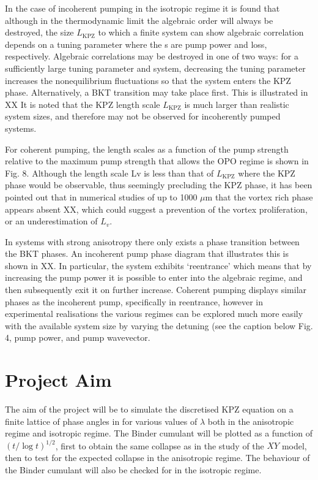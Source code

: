 In the case of incoherent pumping in the isotropic regime
it is found that although in the thermodynamic limit the
algebraic order will always be destroyed, the size $L_{\text{KPZ}}$ to which
a finite system can show algebraic correlation depends on a tuning parameter where the s are pump power and loss, respectively. Algebraic correlations may be destroyed in one of two ways: for a sufficiently large tuning parameter and system, decreasing the tuning parameter increases the nonequilibrium fluctuations so that the system enters the KPZ phase. Alternatively, a BKT transition may take place first. This is illustrated in XX It is noted that the KPZ length scale $L_{\text{KPZ}}$ is much larger than realistic system sizes, and therefore may not be observed for incoherently pumped systems.

For coherent pumping, the length scales as a function of the pump strength relative to the maximum pump strength that allows the OPO regime is shown in Fig. 8. Although the length scale Lv is less than that of $L_{\text{KPZ}}$ where the KPZ phase would be observable, thus seemingly precluding the KPZ phase, it has been pointed out that in numerical studies of up to 1000 $\mu$m that the vortex rich phase appears absent XX, which could suggest a prevention of the vortex proliferation, or an underestimation of $L_v$.

In systems with strong anisotropy there only exists a phase transition between the BKT phases. An incoherent pump phase diagram that illustrates this is shown in XX. In particular, the system exhibits ‘reentrance’ which means that by increasing the pump power it is possible to enter into the algebraic regime, and then subsequently exit it on further increase. Coherent pumping displays similar phases as the incoherent pump, specifically in reentrance, however in experimental realisations the various regimes can be explored much more easily with the available system size by varying the detuning (see the caption below Fig. 4, pump power, and pump wavevector. 

\section{Project Aim}

The aim of the project will be to simulate the discretised KPZ equation on a finite lattice of phase angles in for various values of $\lambda$ both in the anisotropic regime and isotropic regime. The Binder cumulant will be plotted as a function of $(t/\log t)^{1/2}$, first to obtain the same collapse as in the study of the $XY$ model, then to test for the expected collapse in the anisotropic regime. The behaviour of the Binder cumulant will also be checked for in the isotropic regime. 

